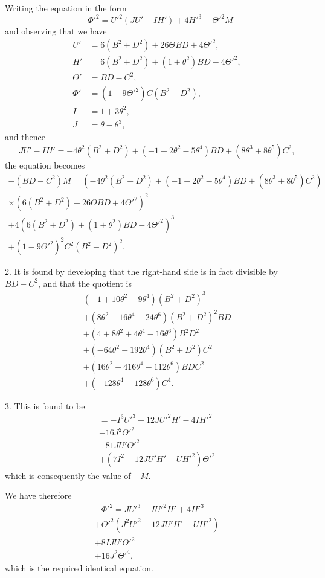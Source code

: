 \documentclass[11pt,a4paper]{article}
\theoremstyle{plain}
\begin{document}
Writing the equation in the form
\[
-\Phi'^2 = U'^2(JU' - IH') + 4H'^3 + \Theta'^2 M
\]
and observing that we have
\begin{align*}
U' &= 6(B^2 + D^2) + 26\Theta BD + 4\Theta'^2, \\
H' &= 6(B^2 + D^2) + (1 + \theta^2)BD - 4\Theta'^2, \\
\Theta' &= BD - C^2, \\
\Phi' &= (1 - 9\Theta'^2)C(B^2 - D^2), \\
I &= 1 + 3\theta^2, \\
J &= \theta - \theta^3,
\end{align*}
and thence
\[
JU' - IH' = -4\theta^2(B^2 + D^2) + (-1 - 2\theta^2 - 5\theta^4)BD + (8\theta^3 + 8\theta^5)C^2,
\]
the equation becomes
\begin{multline*}
-(BD-C^2)M = (-4\theta^2(B^2+D^2) + (-1-2\theta^2-5\theta^4)BD + (8\theta^3+8\theta^5)C^2) \\
\times (6(B^2+D^2) + 26\Theta BD + 4\Theta'^2)^2 \\
+ 4(6(B^2+D^2) + (1+\theta^2)BD - 4\Theta'^2)^3 \\
+ (1-9\Theta'^2)^2 C^2(B^2-D^2)^2.
\end{multline*}

2. It is found by developing that the right-hand side is in fact divisible by $BD - C^2$, and that the quotient is
\begin{multline*}
(-1 + 10\theta^2 - 9\theta^4)(B^2 + D^2)^3 \\
+ (8\theta^2 + 16\theta^4 - 24\theta^6)(B^2 + D^2)^2 BD \\
+ (4 + 8\theta^2 + 4\theta^4 - 16\theta^6)B^2D^2 \\
+ (-64\theta^2 - 192\theta^4)(B^2 + D^2)C^2 \\
+ (16\theta^2 - 416\theta^4 - 112\theta^6)BDC^2 \\
+ (-128\theta^4 + 128\theta^6)C^4.
\end{multline*}

3. This is found to be
\begin{multline*}
= -I^3U'^3 + 12JU'^2H' - 4IH'^2 \\
- 16J^2\Theta'^2 \\
- 81JU'\Theta'^2 \\
+ (7I^2 - 12JU'H' - UH'^2)\Theta'^2
\end{multline*}
which is consequently the value of $-M$.

We have therefore
\begin{multline*}
-\Phi'^2 = JU'^3 - IU'^2H' + 4H'^3 \\
+ \Theta'^2(J^2U'^2 - 12JU'H' - UH'^2) \\
+ 8IJU'\Theta'^2 \\
+ 16J^2\Theta'^4,
\end{multline*}
which is the required identical equation.
\end{document}
